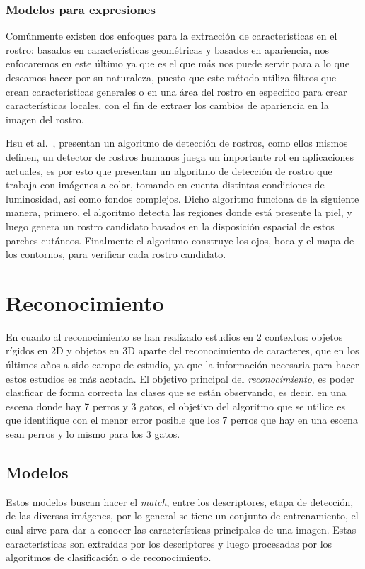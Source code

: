\subsubsection{Modelos para expresiones}
Comúnmente existen dos enfoques para la extracción de características en el rostro: basados en características geométricas y basados en apariencia, nos enfocaremos en este último ya que es el que más nos puede servir para a lo que deseamos hacer por su naturaleza, puesto que este método utiliza filtros que crean características generales o en una área del rostro en especifico para crear características locales, con el fin de extraer los cambios de apariencia en la imagen del rostro.

Hsu et al.~\cite{Hsu2002}, presentan un algoritmo de detección de rostros, como ellos mismos definen, un detector de rostros humanos juega un importante rol en aplicaciones actuales, es por esto que presentan un algoritmo de detección de rostro que trabaja con imágenes a color, tomando en cuenta distintas condiciones de luminosidad, así como fondos complejos. Dicho algoritmo funciona de la siguiente manera, primero, el algoritmo detecta las regiones donde está presente la piel, y luego genera un rostro candidato basados en la disposición espacial de estos parches cutáneos. Finalmente el algoritmo construye los ojos, boca y el mapa de los contornos, para verificar cada rostro candidato.

\section{Reconocimiento}
En cuanto al reconocimiento se han realizado estudios en 2 contextos: objetos rígidos en 2D y objetos en 3D aparte del reconocimiento de caracteres, que en los últimos años a sido campo de estudio, ya que la información necesaria para hacer estos estudios es más acotada. El objetivo principal del \textit{reconocimiento}, es poder clasificar de forma correcta las clases que se están observando, es decir, en una escena donde hay 7 perros y 3 gatos, el objetivo del algoritmo que se utilice es que identifique con el menor error posible que los 7 perros que hay en una escena sean perros y lo mismo para los 3 gatos.
\subsection{Modelos}
Estos modelos buscan hacer el \textit{match}, entre los descriptores, etapa de detección, de las diversas imágenes, por lo general se tiene un conjunto de entrenamiento, el cual sirve para dar a conocer las características principales de una imagen. Estas características son extraídas por los descriptores y luego procesadas por los algoritmos de clasificación o de reconocimiento.
